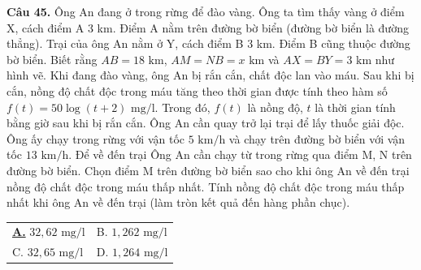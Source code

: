 \documentclass[12pt,a4paper]{article}
\makeatletter
\newcommand{\choiceA}[4]{
    \par\vspace{0.5em}\noindent
    \begin{tabularx}{\textwidth}{@{}X X@{}}
    \underline{\textbf{A.}} #1 & B. #2 \\[
1.2em]
    C. #3 & D. #4
    \end{tabularx}
}
\makeatother
\begin{document}
\textbf{Câu 45.} Ông An đang ở trong rừng để đào vàng. Ông ta tìm thấy vàng ở điểm X, cách điểm A 3 km. Điểm A nằm trên đường bờ biển (đường bờ biển là đường thẳng). Trại của ông An nằm ở Y, cách điểm B 3 km. Điểm B cũng thuộc đường bờ biển. Biết rằng $AB=18\text{ km}$, $AM=NB=x\text{ km}$ và $AX=BY=3\text{ km}$ như hình vẽ. Khi đang đào vàng, ông An bị rắn cắn, chất độc lan vào máu. Sau khi bị cắn, nồng độ chất độc trong máu tăng theo thời gian được tính theo hàm số $f(t)=50\log(t+2)\text{ mg/l}$. Trong đó, $f(t)$ là nồng độ, $t$ là thời gian tính bằng giờ sau khi bị rắn cắn. Ông An cần quay trở lại trại để lấy thuốc giải độc. Ông ấy chạy trong rừng với vận tốc $5\text{ km/h}$ và chạy trên đường bờ biển với vận tốc $13\text{ km/h}$. Để về đến trại Ông An cần chạy từ trong rừng qua điểm M, N trên đường bờ biển. Chọn điểm M trên đường bờ biển sao cho khi ông An về đến trại nồng độ chất độc trong máu thấp nhất. Tính nồng độ chất độc trong máu thấp nhất khi ông An về đến trại (làm tròn kết quả đến hàng phần chục).
\begin{center}
\end{center}
\choiceA{$32,62\text{ mg/l}$}{$1,262\text{ mg/l}$}{$32,65\text{ mg/l}$}{$1,264\text{ mg/l}$}
\end{document}
